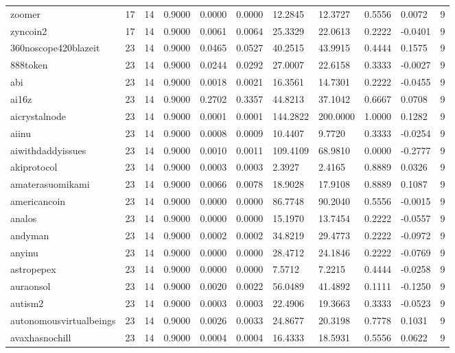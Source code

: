 \begin{table}[htbp]
\begin{tabular}{lllllllllll}
zoomer & 17 & 14 & 0.9000 & 0.0000 & 0.0000 & 12.2845 & 12.3727 & 0.5556 & 0.0072 & 9 \\
zyncoin2 & 17 & 14 & 0.9000 & 0.0061 & 0.0064 & 25.3329 & 22.0613 & 0.2222 & -0.0401 & 9 \\
360noscope420blazeit & 23 & 14 & 0.9000 & 0.0465 & 0.0527 & 40.2515 & 43.9915 & 0.4444 & 0.1575 & 9 \\
888token & 23 & 14 & 0.9000 & 0.0244 & 0.0292 & 27.0007 & 22.6158 & 0.3333 & -0.0027 & 9 \\
abi & 23 & 14 & 0.9000 & 0.0018 & 0.0021 & 16.3561 & 14.7301 & 0.2222 & -0.0455 & 9 \\
ai16z & 23 & 14 & 0.9000 & 0.2702 & 0.3357 & 44.8213 & 37.1042 & 0.6667 & 0.0708 & 9 \\
aicrystalnode & 23 & 14 & 0.9000 & 0.0001 & 0.0001 & 144.2822 & 200.0000 & 1.0000 & 0.1282 & 9 \\
aiinu & 23 & 14 & 0.9000 & 0.0008 & 0.0009 & 10.4407 & 9.7720 & 0.3333 & -0.0254 & 9 \\
aiwithdaddyissues & 23 & 14 & 0.9000 & 0.0010 & 0.0011 & 109.4109 & 68.9810 & 0.0000 & -0.2777 & 9 \\
akiprotocol & 23 & 14 & 0.9000 & 0.0003 & 0.0003 & 2.3927 & 2.4165 & 0.8889 & 0.0326 & 9 \\
amaterasuomikami & 23 & 14 & 0.9000 & 0.0066 & 0.0078 & 18.9028 & 17.9108 & 0.8889 & 0.1087 & 9 \\
americancoin & 23 & 14 & 0.9000 & 0.0000 & 0.0000 & 86.7748 & 90.2040 & 0.5556 & -0.0015 & 9 \\
analos & 23 & 14 & 0.9000 & 0.0000 & 0.0000 & 15.1970 & 13.7454 & 0.2222 & -0.0557 & 9 \\
andyman & 23 & 14 & 0.9000 & 0.0002 & 0.0002 & 34.8219 & 29.4773 & 0.2222 & -0.0972 & 9 \\
anyinu & 23 & 14 & 0.9000 & 0.0000 & 0.0000 & 28.4712 & 24.1846 & 0.2222 & -0.0769 & 9 \\
astropepex & 23 & 14 & 0.9000 & 0.0000 & 0.0000 & 7.5712 & 7.2215 & 0.4444 & -0.0258 & 9 \\
auraonsol & 23 & 14 & 0.9000 & 0.0020 & 0.0022 & 56.0489 & 41.4892 & 0.1111 & -0.1250 & 9 \\
autism2 & 23 & 14 & 0.9000 & 0.0003 & 0.0003 & 22.4906 & 19.3663 & 0.3333 & -0.0523 & 9 \\
autonomousvirtualbeings & 23 & 14 & 0.9000 & 0.0026 & 0.0033 & 24.8677 & 20.3198 & 0.7778 & 0.1031 & 9 \\
avaxhasnochill & 23 & 14 & 0.9000 & 0.0004 & 0.0004 & 16.4333 & 18.5931 & 0.5556 & 0.0622 & 9 \\

\end{tabular}
\end{table}
